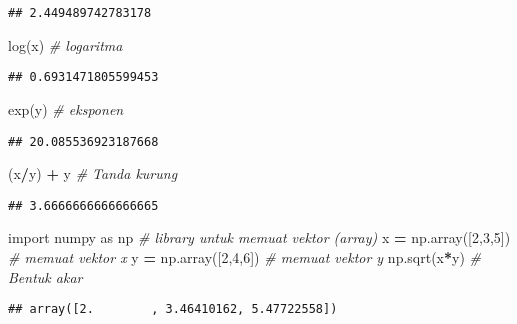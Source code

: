 \documentclass[
]{docs}
\newenvironment{Shaded}{\begin{snugshade}}{\end{snugshade}}
\newcommand{\CommentTok}[1]{\textcolor[rgb]{0.56,0.35,0.01}{\textit{#1}}}
\newcommand{\DecValTok}[1]{\textcolor[rgb]{0.00,0.00,0.81}{#1}}
\newcommand{\ImportTok}[1]{#1}
\newcommand{\NormalTok}[1]{#1}
\newcommand{\OperatorTok}[1]{\textcolor[rgb]{0.81,0.36,0.00}{\textbf{#1}}}
\begin{document}
\begin{verbatim}
## 2.449489742783178
\end{verbatim}

\begin{Shaded}
\begin{Highlighting}[]
\NormalTok{log(x)                        }\CommentTok{\# logaritma }
\end{Highlighting}
\end{Shaded}

\begin{verbatim}
## 0.6931471805599453
\end{verbatim}

\begin{Shaded}
\begin{Highlighting}[]
\NormalTok{exp(y)                        }\CommentTok{\# eksponen}
\end{Highlighting}
\end{Shaded}

\begin{verbatim}
## 20.085536923187668
\end{verbatim}

\begin{Shaded}
\begin{Highlighting}[]
\NormalTok{(x}\OperatorTok{/}\NormalTok{y) }\OperatorTok{+}\NormalTok{ y                     }\CommentTok{\# Tanda kurung}
\end{Highlighting}
\end{Shaded}

\begin{verbatim}
## 3.6666666666666665
\end{verbatim}

\begin{Shaded}
\begin{Highlighting}[]
\ImportTok{import}\NormalTok{ numpy }\ImportTok{as}\NormalTok{ np      }\CommentTok{\# library untuk memuat vektor (array)}
\NormalTok{x }\OperatorTok{=}\NormalTok{ np.array([}\DecValTok{2}\NormalTok{,}\DecValTok{3}\NormalTok{,}\DecValTok{5}\NormalTok{])   }\CommentTok{\# memuat vektor x}
\NormalTok{y }\OperatorTok{=}\NormalTok{ np.array([}\DecValTok{2}\NormalTok{,}\DecValTok{4}\NormalTok{,}\DecValTok{6}\NormalTok{])   }\CommentTok{\# memuat vektor y}
\NormalTok{np.sqrt(x}\OperatorTok{*}\NormalTok{y)            }\CommentTok{\# Bentuk akar}
\end{Highlighting}
\end{Shaded}

\begin{verbatim}
## array([2.        , 3.46410162, 5.47722558])
\end{verbatim}
\end{document}
